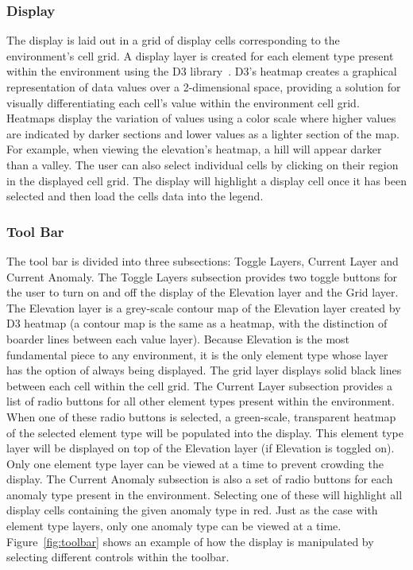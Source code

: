 \subsubsection{Display}
The display is laid out in a grid of display cells corresponding to the environment's cell grid.
A display layer is created for each element type present within the environment using the D3 library~\cite{d3}.
D3's heatmap creates a graphical representation of data values over a 2-dimensional space, providing a solution for visually differentiating each cell's value within the environment cell grid.
Heatmaps display the variation of values using a color scale where higher values are indicated by darker sections and lower values as a lighter section of the map.
For example, when viewing the elevation's heatmap, a hill will appear darker than a valley.
The user can also select individual cells by clicking on their region in the displayed cell grid.
The display will highlight a display cell once it has been selected and then load the cells data into the legend.


\subsubsection{Tool Bar}
The tool bar is divided into three subsections: Toggle Layers, Current Layer and Current Anomaly.
The Toggle Layers subsection provides two toggle buttons for the user to turn on and off the display of the Elevation layer and the Grid layer.
The Elevation layer is a grey-scale contour map of the Elevation layer created by D3 heatmap (a contour map is the same as a heatmap, with the distinction of boarder lines between each value layer).
Because Elevation is the most fundamental piece to any environment, it is the only element type whose layer has the option of always being displayed.
The grid layer displays solid black lines between each cell within the cell grid.
The Current Layer subsection provides a list of radio buttons for all other element types present within the environment.
When one of these radio buttons is selected, a green-scale, transparent heatmap of the selected element type will be populated into the display.
This element type layer will be displayed on top of the Elevation layer (if Elevation is toggled on).
Only one element type layer can be viewed at a time to prevent crowding the display.
The Current Anomaly subsection is also a set of radio buttons for each anomaly type present in the environment.
Selecting one of these will highlight all display cells containing the given anomaly type in red.
Just as the case with element type layers, only one anomaly type can be viewed at a time.
Figure~\ref{fig:toolbar} shows an example of how the display is manipulated by selecting different controls within the toolbar.

